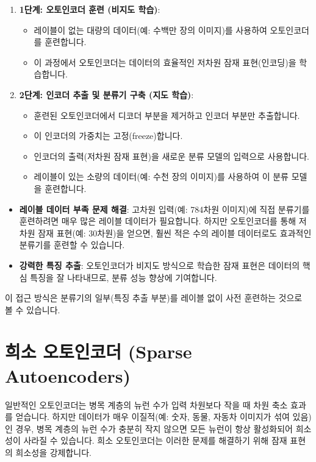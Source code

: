 \documentclass[11pt,a4paper]{article}
\begin{document}
\begin{enumerate}
    \item \textbf{1단계: 오토인코더 훈련 (비지도 학습)}:
        \begin{itemize}
            \item 레이블이 없는 대량의 데이터(예: 수백만 장의 이미지)를 사용하여 오토인코더를 훈련합니다.
            \item 이 과정에서 오토인코더는 데이터의 효율적인 저차원 잠재 표현(인코딩)을 학습합니다.
        \end{itemize}
    \item \textbf{2단계: 인코더 추출 및 분류기 구축 (지도 학습)}:
        \begin{itemize}
            \item 훈련된 오토인코더에서 디코더 부분을 제거하고 인코더 부분만 추출합니다.
            \item 이 인코더의 가중치는 고정(freeze)합니다.
            \item 인코더의 출력(저차원 잠재 표현)을 새로운 분류 모델의 입력으로 사용합니다.
            \item 레이블이 있는 소량의 데이터(예: 수천 장의 이미지)를 사용하여 이 분류 모델을 훈련합니다.
        \end{itemize}
\end{enumerate}

\begin{tcolorbox}[title=\textbf{사전 훈련의 이점}]
\begin{itemize}
    \item \textbf{레이블 데이터 부족 문제 해결}: 고차원 입력(예: 784차원 이미지)에 직접 분류기를 훈련하려면 매우 많은 레이블 데이터가 필요합니다. 하지만 오토인코더를 통해 저차원 잠재 표현(예: 30차원)을 얻으면, 훨씬 적은 수의 레이블 데이터로도 효과적인 분류기를 훈련할 수 있습니다.
    \item \textbf{강력한 특징 추출}: 오토인코더가 비지도 방식으로 학습한 잠재 표현은 데이터의 핵심 특징을 잘 나타내므로, 분류 성능 향상에 기여합니다.
\end{itemize}
이 접근 방식은 분류기의 일부(특징 추출 부분)를 레이블 없이 사전 훈련하는 것으로 볼 수 있습니다.
\end{tcolorbox}

\newpage
\section{희소 오토인코더 (Sparse Autoencoders)}
일반적인 오토인코더는 병목 계층의 뉴런 수가 입력 차원보다 작을 때 차원 축소 효과를 얻습니다. 하지만 데이터가 매우 이질적(예: 숫자, 동물, 자동차 이미지가 섞여 있음)인 경우, 병목 계층의 뉴런 수가 충분히 작지 않으면 모든 뉴런이 항상 활성화되어 희소성이 사라질 수 있습니다. 희소 오토인코더는 이러한 문제를 해결하기 위해 잠재 표현의 희소성을 강제합니다.
\end{document}
